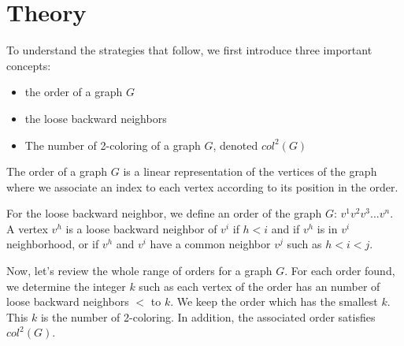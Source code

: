 \chapter{Theory}

To understand the strategies that follow, we first introduce three important concepts:
\begin{itemize}
\item the order of a graph $G$
\item the loose backward neighbors
\item The number of 2-coloring of a graph $G$, denoted $col^{2}(G)$
\end{itemize}

The order of a graph $G$ is a linear representation of the vertices of the graph where we associate an index to each vertex according to its position in the order.

For the loose backward neighbor, we define an order of the graph $G$: $v^{1} v^{2} v^{3}... v^{n}$. A vertex $v^{h}$ is a loose backward neighbor of $v^{i}$ if $h < i$ and if $v^{h}$ is in $v^{i}$ neighborhood, or if $v^{h}$ and $v^{i}$ have a common neighbor $v^{j}$ such as $ h < i < j$.

Now, let's review the whole range of orders for a graph $G$. For each order found, we determine the integer $k$ such as each vertex of the order has an number of loose backward neighbors $<$ to $k$. We keep the order which has the smallest $k$. This $k$ is the number of 2-coloring. In addition, the associated order satisfies $col^{2}(G)$.

%
%
%
%
